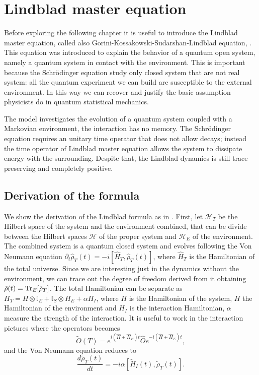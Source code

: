 \chapter{Lindblad master equation}\label{C_Lindblad}
Before exploring the following chapter it is useful to introduce the Lindblad master equation, called also Gorini-Kossakowski-Sudarshan-Lindblad equation, \cite{Lindblad,G_K_S}. This equation was introduced to explain the behavior of a quantum open system, namely a quantum system in contact with the environment. This is important because the Schrödinger equation study only closed system that are not real system: all the quantum experiment we can build are susceptible to the external environment.
In this way we can recover and justify the basic assumption physicists do in quantum statistical mechanics.

The model investigates the evolution of a quantum system coupled with a Markovian environment, the interaction has no memory.  
The Schrödinger equation requires an unitary time operator that does not allow decays; instead the time operator of Lindblad master equation allows the system to dissipate energy with the surrounding. 
Despite that, the Lindblad dynamics is still trace preserving and completely positive.

\section{Derivation of the formula}
We show the derivation of the Lindblad formula as in \cite{Manzano}.
First, let $\mathcal{H}_T$ be the Hilbert space of the system and the environment combined, that can be divide between the Hilbert spaces $\mathcal{H}$ of the proper system and $\mathcal{H}_E$ of the environment. The combined system is a quantum closed system and evolves following the Von Neumann equation $\partial_t\hat\rho_T(t) = -i[\hat H_T,\hat\rho_T(t)]$, where $\hat H_T$ is the Hamiltonian of the total universe.
Since we are interesting just in the dynamics without the environment, we can trace out the degree of freedom derived from it obtaining $\hat\rho(t) = \operatorname{Tr}_E[\hat\rho_T]$. The total Hamiltonian can be separate as $H_T = H \otimes \mathbb{I}_E + \mathbb{I}_S \otimes H_E + \alpha H_I$, where $H$ is the Hamiltonian of the system, $H$ the Hamiltonian of the environment and $H_I$ is the interaction Hamiltonian, $\alpha$  measure the strength of the interaction.
It is useful to work in the interaction pictures where the operators becomes
\begin{equation}
    \tilde O(T) = e^{i(\hat H+\hat H_E)t}\hat O e^{-i(\hat H+\hat H_E)t},
\end{equation}
and the Von Neumann equation reduces to 
\begin{equation}\label{C_interacting_picture}
    \frac{d\tilde\rho_T(t)}{dt}= -i\alpha\left[\tilde H_I(t),\tilde\rho_T(t)\right].
\end{equation}  

